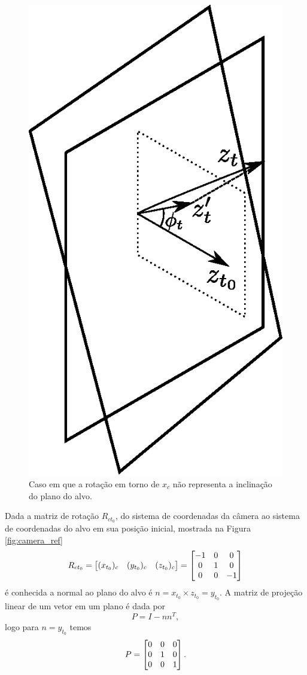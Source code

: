 \begin{figure}[!ht]
\centering
  \includegraphics[width=0.3\linewidth]{./img/projection2.eps}
  \caption{Caso em que a rotação em torno de ${x}_c$ não representa a inclinação do plano do alvo.}
  \label{fig:projection}
\end{figure}%


Dada a matriz de rotação ${R}_{ct_0}$, do sistema de coordenadas da câmera ao sistema de coordenadas do alvo em sua posição inicial, mostrada na Figura \ref{fig:camera_ref}
\begin{equation}
{R}_{ct_0} = \begin{bmatrix} ({x}_{t_0})_c & ({y}_{t_0})_c  & ({z}_{t_0})_c\end{bmatrix} = 
\begin{bmatrix}
	-1 & 0 & 0 \\
	0 & 1 & 0 \\
	0 & 0 & -1
\end{bmatrix}
\end{equation}
é conhecida a normal ao plano do alvo é ${n} = {x}_{t_0} \times {z}_{t_0} =  {y}_{t_0} $. A matriz de projeção linear \citep{strang} de um vetor em um plano é dada por
\begin{equation}
{P} = {I} - {n} {n}^T,
\end{equation}
logo para ${n} = {y}_{t_0}$ temos 
\begin{equation}
{P} =  \begin{bmatrix}
	 0  &   0  &   0 \\
     0  &   1  &   0 \\
     0  &   0  &   1
\end{bmatrix}.
\end{equation}

